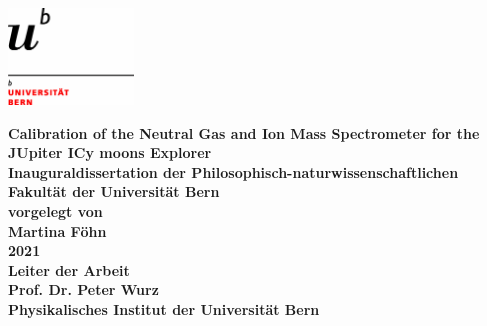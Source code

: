 \documentclass[a4paper, 12pt, abstracton]{scrartcl}
\begin{document}
\renewcommand{\arraystretch}{1.5} %
\selectfont			%

\begin{titlepage}
	
	\begin{flushright}
		\includegraphics[width=0.25\textwidth]{Bilder/logo-uni.jpg}\\[2cm]    
	\end{flushright}
	
	\begin{center} %
		\huge \bfseries Calibration of the Neutral Gas and Ion Mass Spectrometer for the JUpiter ICy moons Explorer \\[2cm]
		\Large Inauguraldissertation der Philosophisch-naturwissenschaftlichen Fakultät der Universität Bern\\[1.5cm]
		\Large vorgelegt von\\[0.1cm]
		\Large Martina Föhn\\[0.8cm]
		\Large 2021\\[1cm] %
		\Large Leiter der Arbeit\\[0.1cm]
		\Large Prof. Dr. Peter Wurz\\[1cm]
		\Large Physikalisches Institut der Universität Bern\\
		
	\end{center}
\end{titlepage}

	
\end{document}
